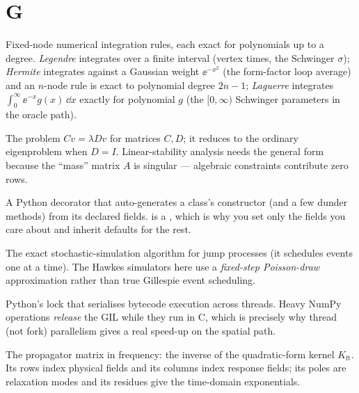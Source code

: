 \section*{G}
\begin{description}[leftmargin=0pt,style=nextline]

  \item[Gauss--Legendre / Gauss--Hermite / Gauss--Laguerre quadrature] Fixed-node
        numerical integration rules, each exact for polynomials up to a degree.
        \emph{Legendre} integrates over a finite interval (vertex times, the
        Schwinger $\sigma$); \emph{Hermite} integrates against a Gaussian weight
        $\ee^{-x^{2}}$ (the form-factor loop average) and an $n$-node rule is exact
        to polynomial degree $2n-1$; \emph{Laguerre} integrates
        $\int_0^{\infty}\ee^{-x}g(x)\,\dd x$ exactly for polynomial $g$ (the
        $[0,\infty)$ Schwinger parameters in the oracle path).

  \item[Generalized eigenvalue problem] The problem $C v=\lambda D v$ for matrices
        $C,D$; it reduces to the ordinary eigenproblem when $D=I$. Linear-stability
        analysis needs the general form because the ``mass'' matrix $A$ is singular
        --- algebraic constraints contribute zero rows.

  \item[\code{@dataclass}] A Python decorator that auto-generates a class's
        constructor (and a few dunder methods) from its declared fields. 
        is a , which is why you set only the fields you care about
        and inherit defaults for the rest.

  \item[Gillespie] The exact stochastic-simulation algorithm for jump processes (it
        schedules events one at a time). The Hawkes simulators here use a
        \emph{fixed-step Poisson-draw} approximation rather than true Gillespie
        event scheduling.

  \item[GIL (Global Interpreter Lock)] Python's lock that serialises bytecode
        execution across threads. Heavy NumPy operations \emph{release} the GIL
        while they run in C, which is precisely why thread (not fork) parallelism
        gives a real speed-up on the spatial path.

  \item[\code{G\_ft = K\_ft$^{-1}$}] The propagator matrix in frequency: the inverse
        of the quadratic-form kernel $K_{\mathrm{ft}}$. Its rows index physical
        fields and its columns index response fields; its poles are relaxation
        modes and its residues give the time-domain exponentials.


\end{description}
